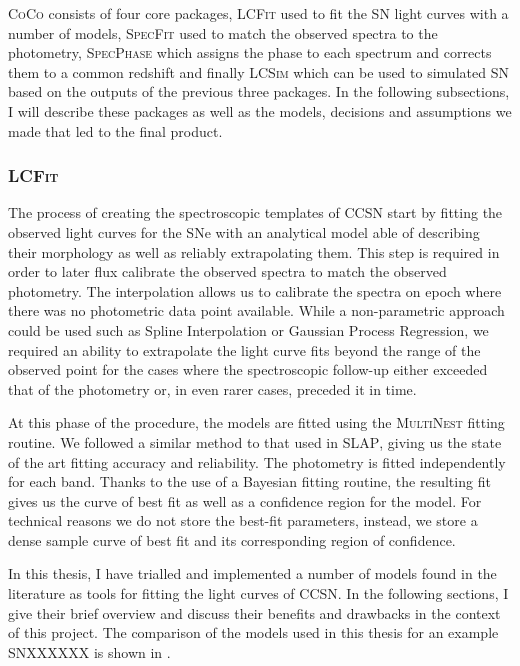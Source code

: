 \textsc{CoCo} consists of four core packages, \textsc{LCFit} used to fit the SN light curves with a number of models, \textsc{SpecFit} used to match the observed spectra to the photometry, \textsc{SpecPhase} which assigns the phase to each spectrum and corrects them to a common redshift and finally \textsc{LCSim} which can be used to simulated SN based on the outputs of the previous three packages. In the following subsections, I will describe these packages as well as the models, decisions and assumptions we made that led to the final product.

\subsubsection{\textsc{LCFit}} \label{sec:LCFit}
The process of creating the spectroscopic templates of CCSN start by fitting the observed light curves for the SNe with an analytical model able of describing their morphology as well as reliably extrapolating them. This step is required in order to later flux calibrate the observed spectra to match the observed photometry. The interpolation allows us to calibrate the spectra on epoch where there was no photometric data point available. While a non-parametric approach could be used such as Spline Interpolation or Gaussian Process Regression, we required an ability to extrapolate the light curve fits beyond the range of the observed point for the cases where the spectroscopic follow-up either exceeded that of the photometry or, in even rarer cases, preceded it in time.

At this phase of the procedure, the models are fitted using the \textsc{MultiNest} fitting routine. We followed a similar method to that used in \textsc{SLAP}, giving us the state of the art fitting accuracy and reliability. The photometry is fitted independently for each band. Thanks to the use of a Bayesian fitting routine, the resulting fit gives us the curve of best fit as well as a confidence region for the model. For technical reasons we do not store the best-fit parameters, instead, we store a dense sample curve of best fit and its corresponding region of confidence.

In this thesis, I have trialled and implemented a number of models found in the literature as tools for fitting the light curves of CCSN. In the following sections, I give their brief overview and discuss their benefits and drawbacks in the context of this project. The comparison of the models used in this thesis for an example SNXXXXXX is shown in .

